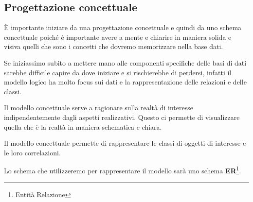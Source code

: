 \subsection{Progettazione concettuale}

È importante iniziare da una progettazione concettuale e quindi da uno schema concettuale poiché è importante avere a mente e chiarire in maniera solida e visiva quelli che sono i concetti che dovremo memorizzare nella base dati.

Se iniziassimo subito a mettere mano alle componenti specifiche delle basi di dati sarebbe difficile capire da dove iniziare e si rischierebbe di perdersi, infatti il modello logico ha molto focus sui dati e la rappresentazione delle relazioni e delle classi.

Il modello concettuale serve a ragionare sulla realtà di interesse indipendentemente dagli aspetti realizzativi. Questo ci permette di visualizzare quella che è la realtà in maniera schematica e chiara.

Il modello concettuale permette di rappresentare le classi di oggetti di interesse e le loro correlazioni.

Lo schema che utilizzeremo per rappresentare il modello sarà uno schema \textbf{ER}\footnote{Entità Relazione}.
